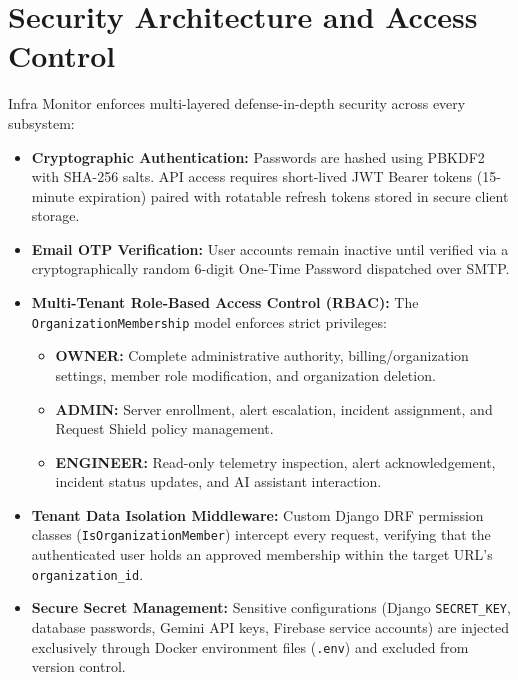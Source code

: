 \section{Security Architecture and Access Control}
Infra Monitor enforces multi-layered defense-in-depth security across every subsystem:

\begin{itemize}
  \item \textbf{Cryptographic Authentication:} Passwords are hashed using PBKDF2 with SHA-256 salts. API access requires short-lived JWT Bearer tokens (15-minute expiration) paired with rotatable refresh tokens stored in secure client storage.
  
  \item \textbf{Email OTP Verification:} User accounts remain inactive until verified via a cryptographically random 6-digit One-Time Password dispatched over SMTP.
  
  \item \textbf{Multi-Tenant Role-Based Access Control (RBAC):} The \texttt{OrganizationMembership} model enforces strict privileges:
  \begin{itemize}
    \item \textbf{OWNER:} Complete administrative authority, billing/organization settings, member role modification, and organization deletion.
    \item \textbf{ADMIN:} Server enrollment, alert escalation, incident assignment, and Request Shield policy management.
    \item \textbf{ENGINEER:} Read-only telemetry inspection, alert acknowledgement, incident status updates, and AI assistant interaction.
  \end{itemize}
  
  \item \textbf{Tenant Data Isolation Middleware:} Custom Django DRF permission classes (\texttt{IsOrganizationMember}) intercept every request, verifying that the authenticated user holds an approved membership within the target URL's \texttt{organization\_id}.
  
  \item \textbf{Secure Secret Management:} Sensitive configurations (Django \texttt{SECRET\_KEY}, database passwords, Gemini API keys, Firebase service accounts) are injected exclusively through Docker environment files (\texttt{.env}) and excluded from version control.
\end{itemize}

